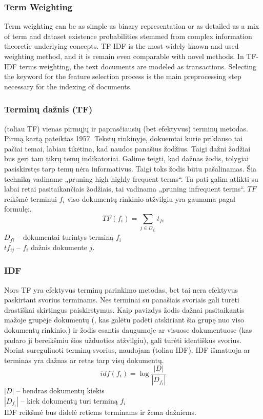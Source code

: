 \documentclass{VUMIFInfKursinis}
\begin{document}
\subsubsection{Term Weighting}
Term weighting can be as simple as binary representation or as detailed as a mix of term and dataset existence probabilities stemmed from complex information theoretic underlying concepts. TF-IDF is the most widely known and used weighting method, and it is remain even comparable with novel methods. In TF-IDF terms weighting, the text documents are modeled as transactions.  Selecting the keyword for the feature selection process is the main preprocessing step necessary for the indexing of documents.

\subsubsection{Terminų dažnis (TF)}
 (toliau TF) vienas pirmųjų ir paprasčiausių (bet efektyvus) terminų metodas. Pirmą kartą pateiktas 1957\cite{luhn1957statistical}. Tekstų rinkinyje, dokuemtai kurie priklauso tai pačiai temai, labiau tikėtina, kad naudos panašius žodžius. Taigi dažni žodžiai bus geri tam tikrų temų indikatoriai. Galime teigti, kad dažnas žodis, tolygiai pasiskirstęs tarp temų nėra informativus. Taigi toks žodis būtu pašalinamas. Šia techniką vadiname „pruning high highly frequent terms“. Ta pati galim  atlikti su labai retai pasitaikančiais žodžiais, tai vadinama „pruning infrequent terms“.
$TF$ reikšmė terminui $f_i$ viso dokumentų rinkinio atžvilgiu yra gaunama pagal formulę:.
\begin{equation}
	TF(f_i)=\sum_{j\in D_{f_i}} t_{fi}
\end{equation}
$D_{fi}$ – dokumentai turintys terminą $f_i$\\ 
$tf_{ij}$ – $f_i$ dažnis  dokumente $j$.

\subsubsection{IDF}
Nors TF yra efektyvus terminų parinkimo metodas, bet tai nera efektyvus paskirtant svorius terminams. Nes terminai su panašiais svoriais gali turėti drastiškai skirtingus paiskirstymus. Kaip pavizdys žodis dažnai pasitaikantis mažoje grupėje dokumentų (, kas galėtu padėti atskiriant šia grupę nuo viso dokumentų rinkinio,) ir žodis esantis daugumoje ar visuose dokumentuose (kas padaro ji bereikšmiu šios užduoties atžvilgiu), gali turėti identiškus svorius. Norint sureguliuoti terminų svorius, naudojam  (toliau IDF). IDF išmatuoja ar terminas yra dažnas ar retas tarp visų dokumentų.
\begin{equation}
	idf(f_i)=\log\frac{|D|}{|D_{f_i}|}
\end{equation}
$|D|$ – bendras dokumentų kiekis\\
$|D_{f_i}|$  – kiek dokumentų turi terminą $f_i$\\
IDF reikšmė bus didelė retiems terminams ir žema dažniems.
\end{document}
